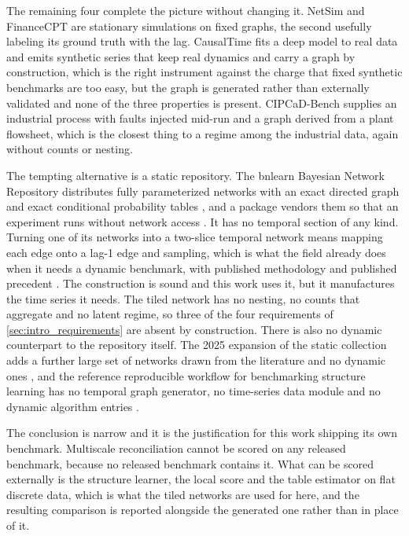The remaining four complete the picture without changing it. NetSim and
FinanceCPT are stationary simulations on fixed graphs, the second usefully
labeling its ground truth with the lag. CausalTime fits a deep model to real data
and emits synthetic series that keep real dynamics and carry a graph by
construction, which is the right instrument against the charge that fixed
synthetic benchmarks are too easy, but the graph is generated rather than
externally validated and none of the three properties is present. CIPCaD-Bench
supplies an industrial process with faults injected mid-run and a graph derived
from a plant flowsheet, which is the closest thing to a regime among the
industrial data, again without counts or nesting.

The tempting alternative is a static repository. The bnlearn Bayesian Network
Repository distributes fully parameterized networks with an exact directed graph
and exact conditional probability tables \citep{scutari2010bnlearn}, and a
package vendors them so that an experiment runs without network access
\citep{ankan2024pgmpy}. It has no temporal section of any kind. Turning one of
its networks into a two-slice temporal network means mapping each edge onto a
lag-1 edge and sampling, which is what the field already does when it needs a
dynamic benchmark, with published methodology and published precedent
\citep{trabelsi2013benchmarking, ouyang2023divideconquer}. The construction is
sound and this work uses it, but it manufactures the time series it needs. The
tiled network has no nesting, no counts that aggregate and no latent regime, so
three of the four requirements of \cref{sec:intro_requirements} are absent by
construction. There is also no dynamic counterpart to the repository itself. The
2025 expansion of the static collection adds a further large set of networks
drawn from the literature and no dynamic ones \citep{leonelli2025bnrep}, and the
reference reproducible
workflow for benchmarking structure learning has no temporal graph generator, no
time-series data module and no dynamic algorithm entries
\citep{rios2025benchpress}.

The conclusion is narrow and it is the justification for this work shipping its
own benchmark. Multiscale reconciliation cannot be scored on any released
benchmark, because no released benchmark contains it. What can be scored
externally is the structure learner, the local score and the table estimator on
flat discrete data, which is what the tiled networks are used for here, and the
resulting comparison is reported alongside the generated one rather than in place
of it.

